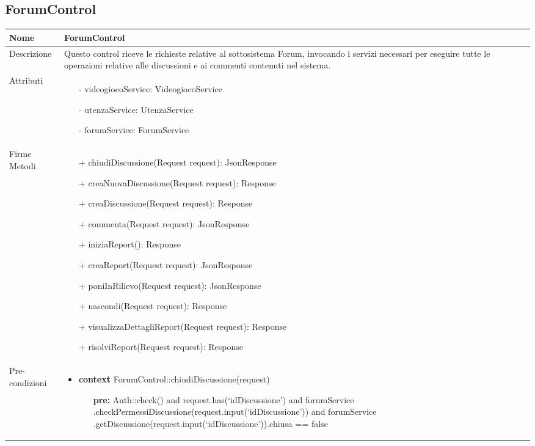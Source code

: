 \subsection{ForumControl}
\small\begin{tabular}{|| l | p{34em} ||} 
	\hline
	Nome & ForumControl\\
	\hline
	Descrizione & Questo control riceve le richieste relative al sottosistema Forum, invocando i servizi necessari per eseguire tutte le operazioni relative alle discussioni e ai commenti contenuti nel sistema. \\
	\hline
	Attributi & \begin{itemize}
		\item[-] videogiocoService: VideogiocoService
		\item[-] utenzaService: UtenzaService
		\item[-] forumService: ForumService
	\end{itemize}\\
	\hline
	Firme Metodi & \begin{itemize}
		\item[+] chiudiDiscussione(Request request): JsonResponse
		\item[+] creaNuovaDiscussione(Request request): Response
		\item[+] creaDiscussione(Request request): Response
		\item[+] commenta(Request request): JsonResponse
		\item[+] iniziaReport(): Response
		\item[+] creaReport(Request request): JsonResponse
		\item[+] poniInRilievo(Request request): JsonResponse
		\item[+] nascondi(Request request): Response
		\item[+] visualizzaDettagliReport(Request request): Response
		\item[+] risolviReport(Request request): Response
	\end{itemize}\\
	\hline
Pre-condizioni & \begin{itemize}[leftmargin=*]
	\item \textbf{context} ForumControl::chiudiDiscussione(request)
	\begin{itemize}
		\item[ ] \textbf{pre:} Auth::check()
		and request.has(‘idDiscussione’)
		and forumService
		  .checkPermessiDiscussione(request.input(‘idDiscussione’))
		and forumService
		  .getDiscussione(request.input(‘idDiscussione’)).chiusa == false	
	\end{itemize}


\end{itemize}
\end{tabular}
